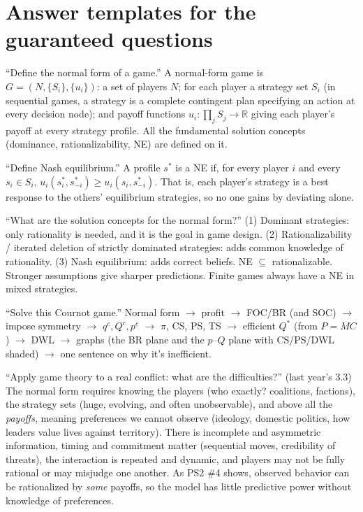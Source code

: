 \documentclass[11pt]{article}
\begin{document}
\section{Answer templates for the guaranteed questions}
\begin{workbox}{``Define the normal form of a game.''}
A normal-form game is $G=(N,\{S_i\},\{u_i\})$: a set of players $N$; for each player a strategy set $S_i$ (in sequential games, a strategy is a complete contingent plan specifying an action at every decision node); and payoff functions $u_i:\prod_jS_j\to\mathbb{R}$ giving each player's payoff at every strategy profile. All the fundamental solution concepts (dominance, rationalizability, NE) are defined on it.
\end{workbox}
\begin{workbox}{``Define Nash equilibrium.''}
A profile $s^*$ is a NE if, for every player $i$ and every $s_i\in S_i$, $u_i(s_i^*,s_{-i}^*)\ge u_i(s_i,s_{-i}^*)$. That is, each player's strategy is a best response to the others' equilibrium strategies, so no one gains by deviating alone.
\end{workbox}
\begin{workbox}{``What are the solution concepts for the normal form?''}
(1) Dominant strategies: only rationality is needed, and it is the goal in game design. (2) Rationalizability / iterated deletion of strictly dominated strategies: adds common knowledge of rationality. (3) Nash equilibrium: adds correct beliefs. NE $\subseteq$ rationalizable. Stronger assumptions give sharper predictions. Finite games always have a NE in mixed strategies.
\end{workbox}
\begin{workbox}{``Solve this Cournot game.''}
Normal form $\to$ profit $\to$ FOC/BR (and SOC) $\to$ impose symmetry $\to$ $q^c,Q^c,p^c$ $\to$ $\pi$, CS, PS, TS $\to$ efficient $Q^*$ (from $P=MC$) $\to$ DWL $\to$ graphs (the BR plane and the $p$--$Q$ plane with CS/PS/DWL shaded) $\to$ one sentence on why it's inefficient.
\end{workbox}
\begin{workbox}{``Apply game theory to a real conflict: what are the difficulties?'' (last year's 3.3)}
The normal form requires knowing the players (who exactly? coalitions, factions), the strategy sets (huge, evolving, and often unobservable), and above all the \emph{payoffs}, meaning preferences we cannot observe (ideology, domestic politics, how leaders value lives against territory). There is incomplete and asymmetric information, timing and commitment matter (sequential moves, credibility of threats), the interaction is repeated and dynamic, and players may not be fully rational or may misjudge one another. As PS2 \#4 shows, observed behavior can be rationalized by \emph{some} payoffs, so the model has little predictive power without knowledge of preferences.
\end{workbox}
\end{document}
